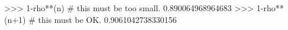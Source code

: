 
>>> 1-rho**(n) #  this must be too small.
0.890064968964683
>>> 1-rho**(n+1) # this must be OK.
0.9061042738330156

